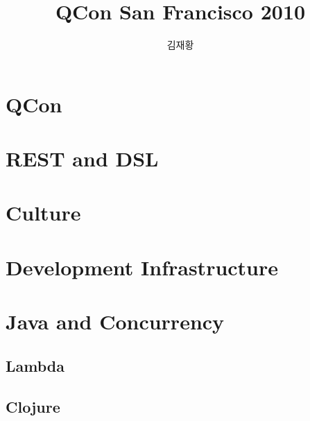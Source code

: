 \documentclass[10pt,unicode,serif,compress,slidetop]{beamer}
\title{QCon San Francisco 2010}
\author{김재황}
\institute{소프트웨어 센터}
\begin{document}
\begin{frame}[plain]
    \titlepage
\end{frame}

\section{QCon}


\section{REST and DSL}



\section{Culture}



\section{Development Infrastructure}




\section{Java and Concurrency}

\subsection{Lambda}


\subsection{Clojure}


\end{document}
